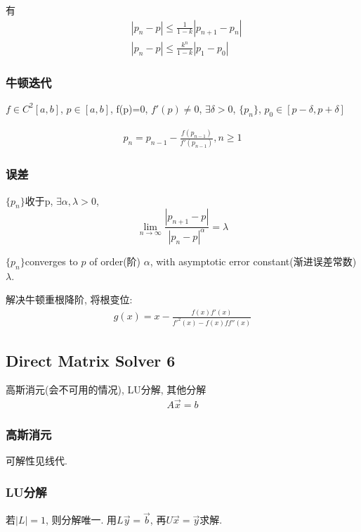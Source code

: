 \documentclass{source/Paper}
\begin{document}
    有\begin{align*}
        &\left| p_n-p \right|\le \frac{1}{1-k}\left| p_{n+1}-p_n \right|\\
        &\left| p_n-p \right|\le \frac{k^n}{1-k}\left| p_1-p_0 \right|
    \end{align*}

    \subsubsection{牛顿迭代}

    \begin{theorem}
        $f\in C^2[a,b]$, $p\in[a,b]$, f(p)=0, $f'(p)\ne 0$, $\exists \delta>0$, $\{p_n\}$, $p_0\in[p-\delta,p+\delta]$
    \end{theorem}

    \begin{align*}
        p_n=p_{n-1}-\frac{f(p_{n-1})}{f'(p_{n-1})}, n\ge 1
    \end{align*}

    \subsubsection{误差}
    \begin{theorem}
        $\{p_n\}$收于p, $\exists \alpha, \lambda >0$, \[\lim_{n \to \infty} \frac{\left| p_{n+1}-p \right|}{\left| p_n-p \right|^{\alpha}}=\lambda\]
    \end{theorem}
    
    $\{p_n\}$converges to $p$ of order(阶) $\alpha$, with asymptotic error constant(渐进误差常数) $\lambda$.

    解决牛顿重根降阶, 将根变位: 
    \begin{align*}
        g(x)=x-\frac{f(x)f'(x)}{f'^2(x)-f(x)ff''(x)}
    \end{align*}

    \subsection{Direct Matrix Solver 6}
    高斯消元(会不可用的情况), LU分解, 其他分解
    \begin{align*}
        A\vec{x}=b
    \end{align*}
    \subsubsection{高斯消元}
    可解性见线代. 

    \subsubsection{LU分解}
    若$\left| L \right|=1$, 则分解唯一. 用$L\vec{y}=\vec{b}$, 再$U\vec{x}=\vec{y}$求解. 
\end{document}

